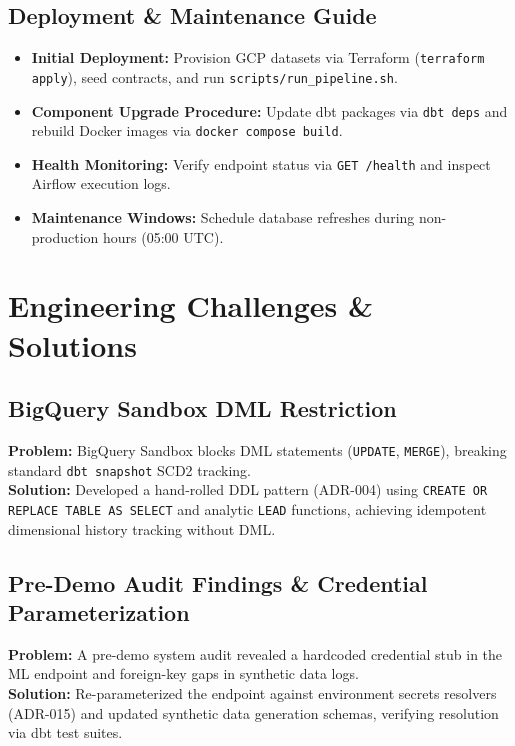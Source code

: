 \documentclass[12pt, a4paper]{report}
\begin{document}
\section{Deployment \& Maintenance Guide}
\begin{itemize}
    \item \textbf{Initial Deployment:} Provision GCP datasets via Terraform (\texttt{terraform apply}), seed contracts, and run \texttt{scripts/run\_pipeline.sh}.
    \item \textbf{Component Upgrade Procedure:} Update dbt packages via \texttt{dbt deps} and rebuild Docker images via \texttt{docker compose build}.
    \item \textbf{Health Monitoring:} Verify endpoint status via \texttt{GET /health} and inspect Airflow execution logs.
    \item \textbf{Maintenance Windows:} Schedule database refreshes during non-production hours (05:00 UTC).
\end{itemize}

\chapter{Engineering Challenges \& Solutions}
\label{chap:challenges}

\section{BigQuery Sandbox DML Restriction}
\textbf{Problem:} BigQuery Sandbox blocks DML statements (\texttt{UPDATE}, \texttt{MERGE}), breaking standard \texttt{dbt snapshot} SCD2 tracking. \\
\textbf{Solution:} Developed a hand-rolled DDL pattern (ADR-004) using \texttt{CREATE OR REPLACE TABLE AS SELECT} and analytic \texttt{LEAD} functions, achieving idempotent dimensional history tracking without DML.

\section{Pre-Demo Audit Findings \& Credential Parameterization}
\label{sec:predemo-detail}
\textbf{Problem:} A pre-demo system audit revealed a hardcoded credential stub in the ML endpoint and foreign-key gaps in synthetic data logs. \\
\textbf{Solution:} Re-parameterized the endpoint against environment secrets resolvers (ADR-015) and updated synthetic data generation schemas, verifying resolution via dbt test suites.
\end{document}
